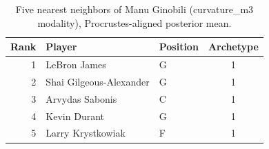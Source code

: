 \begin{table}[htbp]
  \centering\small
  \begin{tabular}{rllc}
    \toprule
    Rank & Player & Position & Archetype \\
    \midrule
    1 & LeBron James & G & 1 \\
    2 & Shai Gilgeous-Alexander & G & 1 \\
    3 & Arvydas Sabonis & C & 1 \\
    4 & Kevin Durant & G & 1 \\
    5 & Larry Krystkowiak & F & 1 \\
    \bottomrule
  \end{tabular}
  \caption{Five nearest neighbors of Manu Ginobili (curvature_m3 modality), Procrustes-aligned posterior mean.}
  \label{tab:Manu_Ginobili_neighbors_curvature_m3}
\end{table}

